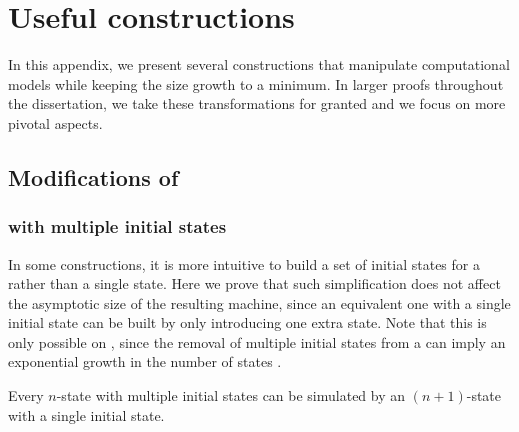 \chapter{Useful constructions}\label{app:constructions}
In this appendix, we present several constructions that manipulate computational models while keeping the size growth to a minimum.
In larger proofs throughout the dissertation, we take these transformations for granted and we focus on more pivotal aspects.



\section{Modifications of \texorpdfstring{\ONFAs}{1NFAs}}


\subsection{\texorpdfstring{\ONFAs}{1NFAs} with multiple initial states}\label{sub:multistart}
In some constructions, it is more intuitive to build a set of initial states for a \ONFA rather than a single state.
Here we prove that such simplification does not affect the asymptotic size of the resulting machine, since an equivalent one with a single initial state can be built by only introducing one extra state.
Note that this is only possible on \ONFAs, since the removal of multiple initial states from a \ODFA can imply an exponential growth in the number of states \cite{HolSal+01}.
\begin{thrm}\label{thm:mult-start-states}
	Every $n$-state \ONFA with multiple initial states can be simulated by an $(n+1)$-state \ONFA with a single initial state.
\end{thrm}
